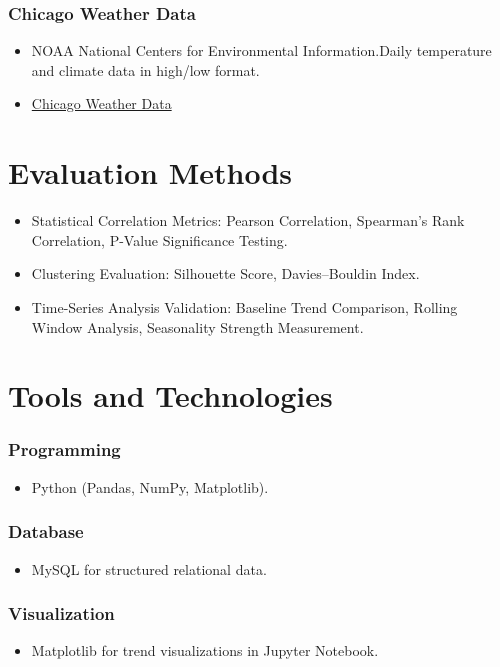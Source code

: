 \documentclass[sigconf,twocolumn,11pt]{acmart}
\begin{document}
\subsubsection{\textbf{Chicago Weather Data}}
\begin{itemize}
    \item NOAA National Centers for Environmental Information.Daily temperature and climate data in high/low format.
    \item\href{https://www.ncdc.noaa.gov/cdo-web/datasets/LCD/stations/WBAN:14819/detai}{Chicago Weather Data}
\end{itemize}

\section{Evaluation Methods}
\begin{itemize}
    \item Statistical Correlation Metrics: Pearson Correlation, Spearman’s Rank Correlation, P-Value Significance Testing.
    \item Clustering Evaluation: Silhouette Score, Davies–Bouldin Index.
    \item Time-Series Analysis Validation: Baseline Trend Comparison, Rolling Window Analysis, Seasonality Strength Measurement.
\end{itemize}

\section{Tools and Technologies}
\subsubsection{\textbf{Programming}}
\begin{itemize}
    \item Python (Pandas, NumPy, Matplotlib).
\end{itemize}

\subsubsection{\textbf{ Database}}
\begin{itemize}
    \item MySQL for structured relational data.
\end{itemize}

\subsubsection{\textbf{Visualization}}
\begin{itemize}
    \item Matplotlib for trend visualizations in Jupyter Notebook.
\end{itemize}
\end{document}
